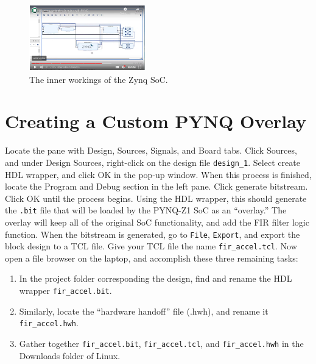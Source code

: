 \documentclass{article}
\begin{document}
\begin{figure}
\centering
\includegraphics[width=0.45\textwidth]{fir_video_6.png}
\caption{\label{fig:vid_5} The inner workings of the Zynq SoC.}
\end{figure}

\section{Creating a Custom PYNQ Overlay}

Locate the pane with Design, Sources, Signals, and Board tabs.  Click Sources, and under Design Sources, right-click on the design file \verb+design_1+.  Select create HDL wrapper, and click OK in the pop-up window.  When this process is finished, locate the Program and Debug section in the left pane.  Click generate bitstream.  Click OK until the process begins.  Using the HDL wrapper, this should generate the \verb+.bit+ file that will be loaded by the PYNQ-Z1 SoC as an ``overlay.''  The overlay will keep all of the original SoC functionality, and add the FIR filter logic function.  When the bitstream is generated, go to \verb+File+, \verb+Export+, and export the block design to a TCL file.  Give your TCL file the name \verb+fir_accel.tcl+.  Now open a file browser on the laptop, and accomplish these three remaining tasks:
\begin{enumerate}
\item In the project folder corresponding the design, find and rename the HDL wrapper \verb+fir_accel.bit+.
\item Similarly, locate the ``hardware handoff'' file (.hwh), and rename it \verb+fir_accel.hwh+.
\item Gather together \verb+fir_accel.bit+, \verb+fir_accel.tcl+, and \verb+fir_accel.hwh+ in the Downloads folder of Linux.
\end{enumerate}
\end{document}
